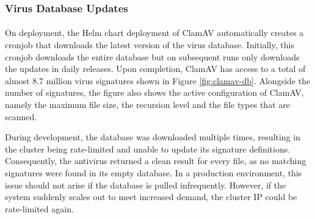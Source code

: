 \documentclass[12pt, conference, final, a4paper, onecolumn, compsoc]{IEEEtran}
\begin{document}
\subsubsection*{Virus Database Updates}
\paragraph{}
On deployment, the Helm chart deployment of ClamAV automatically creates a
cronjob that downloads the latest version of the virus database. Initially, this
cronjob downloads the entire database but on subsequent runs only downloads the
updates in daily releases. Upon completion, ClamAV has access to a total of
almost 8.7 million virus signatures shown in Figure \ref{fig:clamav-db}.
Alongside the number of signatures, the figure also shows the active
configuration of ClamAV, namely the maximum file size, the recursion level and
the file types that are scanned.

During development, the database was downloaded multiple times, resulting in the
cluster being rate-limited and unable to update its signature definitions.
Consequently, the antivirus returned a clean result for every file, as no
matching signatures were found in its empty database. In a production
environment, this issue should not arise if the database is pulled infrequently.
However, if the system suddenly scales out to meet increased demand, the cluster
IP could be rate-limited again.
\end{document}
